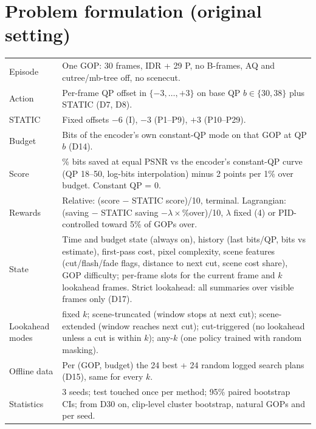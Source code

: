 \documentclass[10pt,a4paper]{article}
\begin{document}
\section{Problem formulation (original setting)}
\begin{tabularx}{\linewidth}{@{}lL@{}}
\toprule
Episode & One GOP: 30 frames, IDR + 29 P, no B-frames, AQ and cutree/mb-tree off, no scenecut. \\
Action & Per-frame QP offset in $\{-3,\dots,+3\}$ on base QP $b\in\{30,38\}$ plus STATIC (D7, D8). \\
STATIC & Fixed offsets $-6$ (I), $-3$ (P1--P9), $+3$ (P10--P29). \\
Budget & Bits of the encoder's own constant-QP mode on that GOP at QP $b$ (D14). \\
Score & \% bits saved at equal PSNR vs the encoder's constant-QP curve (QP 18--50, log-bits interpolation) minus
2 points per 1\% over budget. Constant QP = 0. \\
Rewards & Relative: (score $-$ STATIC score)/10, terminal. Lagrangian: (saving $-$ STATIC saving $-\lambda\times$\%over)/10,
$\lambda$ fixed (4) or PID-controlled toward 5\% of GOPs over. \\
State & Time and budget state (always on), history (last bits/QP, bits vs estimate), first-pass cost, pixel complexity,
scene features (cut/flash/fade flags, distance to next cut, scene cost share), GOP difficulty; per-frame slots for the
current frame and $k$ lookahead frames. Strict lookahead: all summaries over visible frames only (D17). \\
Lookahead modes & fixed $k$; scene-truncated (window stops at next cut); scene-extended (window reaches next cut);
cut-triggered (no lookahead unless a cut is within $k$); any-$k$ (one policy trained with random masking). \\
Offline data & Per (GOP, budget) the 24 best + 24 random logged search plans (D15), same for every $k$. \\
Statistics & 3 seeds; test touched once per method; 95\% paired bootstrap CIs; from D30 on, clip-level cluster
bootstrap, natural GOPs and per seed. \\
\bottomrule
\end{tabularx}
\end{document}
